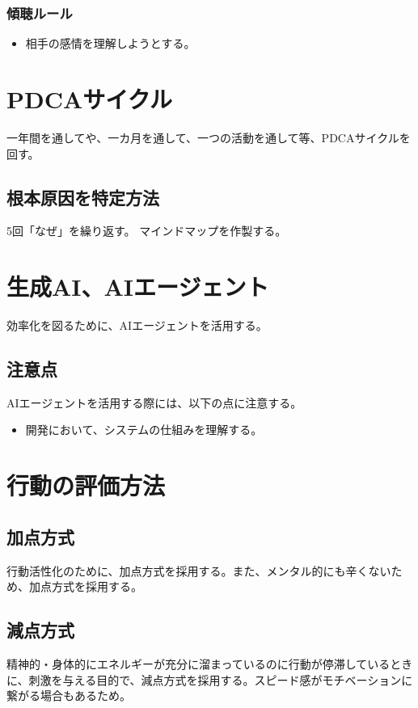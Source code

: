 \documentclass[dvipdfmx]{jlreq}
\begin{document}
        \subsubsection{傾聴ルール}
        \begin{itemize}
            \item 相手の感情を理解しようとする。
        \end{itemize}

\section{PDCAサイクル}
    一年間を通してや、一カ月を通して、一つの活動を通して等、PDCAサイクルを回す。
    \subsection{根本原因を特定方法}
        5回「なぜ」を繰り返す。
        マインドマップを作製する。

\section{生成AI、AIエージェント}
    効率化を図るために、AIエージェントを活用する。
    \subsection{注意点}
    AIエージェントを活用する際には、以下の点に注意する。
    \begin{itemize}
        \item 開発において、システムの仕組みを理解する。
    \end{itemize}



\section{行動の評価方法}
    \subsection{加点方式}
        行動活性化のために、加点方式を採用する。また、メンタル的にも辛くないため、加点方式を採用する。
    \subsection{減点方式}
        精神的・身体的にエネルギーが充分に溜まっているのに行動が停滞しているときに、刺激を与える目的で、減点方式を採用する。スピード感がモチベーションに繋がる場合もあるため。
\end{document}
